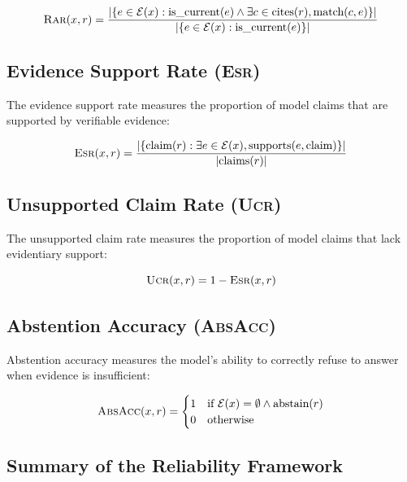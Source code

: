 \documentclass[11pt,a4paper]{article}
\newcommand{\rar}{\textsc{Rar}}
\newcommand{\esr}{\textsc{Esr}}
\newcommand{\ucr}{\textsc{Ucr}}
\newcommand{\absacc}{\textsc{AbsAcc}}
\begin{document}
\begin{equation}
    \rar(x, r) = \frac{|\{e \in \mathcal{E}(x) : \text{is\_current}(e) \wedge \exists c \in \text{cites}(r), \text{match}(c, e)\}|}{|\{e \in \mathcal{E}(x) : \text{is\_current}(e)\}|}
\end{equation}

\subsection{Evidence Support Rate (\esr)}

The evidence support rate measures the proportion of model claims that are supported by verifiable evidence:

\begin{equation}
    \esr(x, r) = \frac{|\{\text{claim}(r) : \exists e \in \mathcal{E}(x), \text{supports}(e, \text{claim})\}|}{|\text{claims}(r)|}
\end{equation}

\subsection{Unsupported Claim Rate (\ucr)}

The unsupported claim rate measures the proportion of model claims that lack evidentiary support:

\begin{equation}
    \ucr(x, r) = 1 - \esr(x, r)
\end{equation}

\subsection{Abstention Accuracy (\absacc)}

Abstention accuracy measures the model's ability to correctly refuse to answer when evidence is insufficient:

\begin{equation}
    \absacc(x, r) = \begin{cases} 1 & \text{if } \mathcal{E}(x) = \emptyset \wedge \text{abstain}(r) \\ 0 & \text{otherwise} \end{cases}
\end{equation}

\subsection{Summary of the Reliability Framework}
\end{document}
